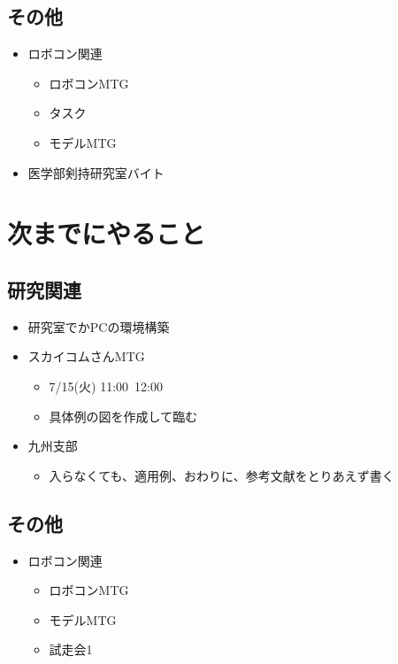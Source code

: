 \documentclass[uplatex, onecolumn, 10pt]{jsarticle}
\begin{document}
\subsection*{その他}
\begin{itemize}
	\item ロボコン関連
	\begin{itemize}
		\item ロボコンMTG
		\item タスク
		\item モデルMTG
	\end{itemize}
	\item 医学部剣持研究室バイト
\end{itemize}


\section{次までにやること}

\subsection*{研究関連}
\begin{itemize}
	\item 研究室でかPCの環境構築
	\item スカイコムさんMTG
	\begin{itemize}
	\item 7/15(火) 11:00~12:00
	\item 具体例の図を作成して臨む
	\end{itemize}
	\item 九州支部
	\begin{itemize}
	\item 入らなくても、適用例、おわりに、参考文献をとりあえず書く
	\end{itemize}
\end{itemize}

\subsection*{その他}
\begin{itemize}
    \item ロボコン関連
		\begin{itemize}
			\item ロボコンMTG
			\item モデルMTG
			\item 試走会1
		\end{itemize}
\end{itemize}
\end{document}

